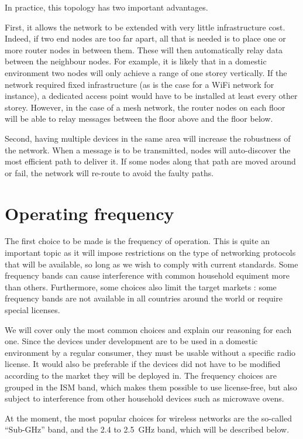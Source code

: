 In practice, this topology has two important advantages.

First, it allows the network to be extended with very little infrastructure
cost. Indeed, if two end nodes are too far apart, all that is needed is to place
one or more router nodes in between them. These will then automatically relay
data between the neighbour nodes. For example, it is likely that in a domestic
environment two nodes will only achieve a range of one storey vertically. If the
network required fixed infrastructure (as is the case for a WiFi network for
instance), a dedicated access point would have to be installed at least every
other storey. However, in the case of a mesh network, the router nodes on each
floor will be able to relay messages between the floor above and the floor
below.

Second, having multiple devices in the same area will increase the robustness of
the network. When a message is to be transmitted, nodes will auto-discover the
most efficient path to deliver it. If some nodes along that path are moved
around or fail, the network will re-route to avoid the faulty paths. 


\section{Operating frequency}\label{sec:frequency}

The first choice to be made is the frequency of operation. This is quite an
important topic as it will impose restrictions on the type of networking
protocols that will be available, so long as we wish to comply with current
standards. Some frequency bands can cause interference with common household
equiment more than others. Furthermore, some choices also limit the target
markets : some frequency bands are not available in all countries around the
world or require special licenses.

We will cover only the most common choices and explain our reasoning for each
one. Since the devices under development are to be used in a domestic
environment by a regular consumer, they must be usable without a specific radio
license. It would also be preferable if the devices did not have to be modified
according to the market they will be deployed in. The frequency choices are
grouped in the \ac{ISM} band, which makes them possible to use license-free, but
also subject to interference from other household devices such as microwave
ovens.

At the moment, the most popular choices for wireless networks are the so-called
``Sub-GHz'' band, and the 2.4 to \SI{2.5}{GHz} band, which will be described
below.

